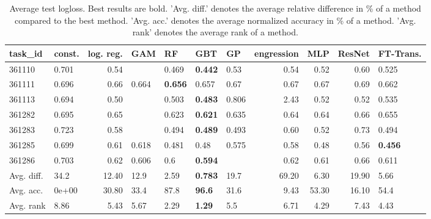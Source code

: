 \begin{table}[ht!]
\centering
\begingroup\footnotesize
\begin{tabular}{llrllllrrrl}
  \hline
\hline
task\_id & const. & log. reg. & GAM & RF & GBT & GP & engression & MLP & ResNet & FT-Trans. \\ 
  \hline
361110 & 0.701 & 0.54 &  & 0.469 & \textbf{0.442} & 0.53 & 0.54 & 0.52 & 0.60 & 0.525 \\ 
  361111 & 0.696 & 0.66 & 0.664 & \textbf{0.656} & 0.657 & 0.67 & 0.67 & 0.67 & 0.69 & 0.662 \\ 
  361113 & 0.694 & 0.50 &  & 0.503 & \textbf{0.483} & 0.806 & 2.43 & 0.52 & 0.52 & 0.535 \\ 
  361282 & 0.695 & 0.65 &  & 0.623 & \textbf{0.621} & 0.635 & 0.64 & 0.64 & 0.66 & 0.655 \\ 
  361283 & 0.723 & 0.58 &  & 0.494 & \textbf{0.489} & 0.493 & 0.60 & 0.52 & 0.73 & 0.494 \\ 
  361285 & 0.699 & 0.61 & 0.618 & 0.481 & 0.48 & 0.575 & 0.58 & 0.48 & 0.56 & \textbf{0.456} \\ 
  361286 & 0.703 & 0.62 & 0.606 & 0.6 & \textbf{0.594} &  & 0.62 & 0.61 & 0.66 & 0.611 \\ 
   \hline
Avg. diff. & 34.2 & 12.40 & 12.9 & 2.59 & \textbf{0.783} & 19.7 & 69.20 & 6.30 & 19.90 & 5.66 \\ 
  Avg. acc. & 0e+00 & 30.80 & 33.4 & 87.8 & \textbf{96.6} & 31.6 & 9.43 & 53.30 & 16.10 & 54.4 \\ 
  Avg. rank & 8.86 & 5.43 & 5.67 & 2.29 & \textbf{1.29} & 5.5 & 6.71 & 4.29 & 7.43 & 4.43 \\ 
   \hline
\hline
\end{tabular}
\endgroup
\caption{Average test logloss. 
                  Best results are bold. 
                  'Avg. diff.' denotes the average relative difference in \% of a method compared to the best method.
                  'Avg. acc.' denotes the average normalized accuracy in \% of a method.
                  'Avg. rank' denotes the average rank of a method.} 
\label{TABLES/table_results_logloss_clustering_num_and_cat_features}
\end{table}
